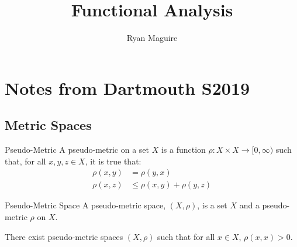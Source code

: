 \documentclass[crop=false,class=article,oneside]{standalone}
\begin{document}
    \title{Functional Analysis}
    \author{Ryan Maguire}
    \date{\vspace{-5ex}}
    \maketitle
    \tableofcontents
    \clearpage
    \section{Notes from Dartmouth S2019}
        \subsection{Metric Spaces}
            \begin{ldefinition}{Pseudo-Metric}
                A pseudo-metric on a set $X$ is a function
                $\rho:X\times{X}\rightarrow[0,\infty)$ such that,
                for all $x,y,z\in{X}$, it is true that:
                \begin{align}
                    \rho(x,y)&=\rho(y,x)
                    \tag{Symmetry}\\
                    \rho(x,z)&\leq\rho(x,y)+\rho(y,z)
                    \tag{Triangle Inequality}
                \end{align}
            \end{ldefinition}
            \begin{ldefinition}{Pseudo-Metric Space}
                A pseudo-metric space, $(X,\rho)$, is a set
                $X$ and a pseudo-metric $\rho$ on $X$.
            \end{ldefinition}
            \begin{theorem}
                There exist pseudo-metric spaces $(X,\rho)$
                such that for all $x\in{X}$, $\rho(x,x)>0$.
            \end{theorem}
\end{document}
